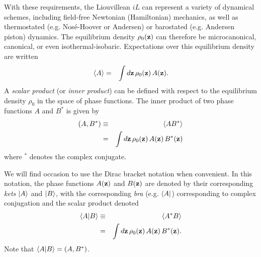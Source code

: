 With these requirements, the Liouvillean $iL$ can represent a variety of dynamical schemes, including field-free Newtonian (Hamiltonian) mechanics, as well as thermostated (e.g. Nos\'{e}-Hoover or Andersen) or barostated (e.g. Andersen piston) dynamics.  
The equilibrium density $\rho_0({\bf z})$ can therefore be microcanonical, canonical, or even isothermal-isobaric. 
Expectations over this equilibrium density are written
\begin{eqnarray}
\langle A \rangle &=& \int d{\bf z} \, \rho_0({\bf z}) \, A({\bf z}).
\end{eqnarray}
A \emph{scalar product} (or \emph{inner product}) can be defined with respect to the equilibrium density $\rho_0$ in the space of phase functions.    \label{notation:inner-product}
The inner product of two phase functions $A$ and $B^*$ is given by
\begin{eqnarray}
(A,B^*) &\equiv& \langle A B^* \rangle \nonumber \\
&=& \int d{\bf z} \, \rho_0({\bf z}) \, A({\bf z}) \, B^*({\bf z})
\end{eqnarray}
where $^*$ denotes the complex conjugate.

We will find occasion to use the Dirac bracket notation when convenient.  
In this notation, the phase functions $A({\bf z})$ and $B({\bf z})$ are denoted by their corresponding \emph{kets} $|A\rangle$ and $|B\rangle$, with the corresponding \emph{bra} (e.g. $\langle A|$) corresponding to complex conjugation and the scalar product denoted
\begin{eqnarray}
\langle A|B\rangle &\equiv& \langle A^* B \rangle \nonumber \\
&=& \int d{\bf z} \, \rho_0({\bf z}) \, A({\bf z}) \, B^*({\bf z}).
\end{eqnarray}
  
Note that $\langle A|B\rangle = (A,B^*)$.

